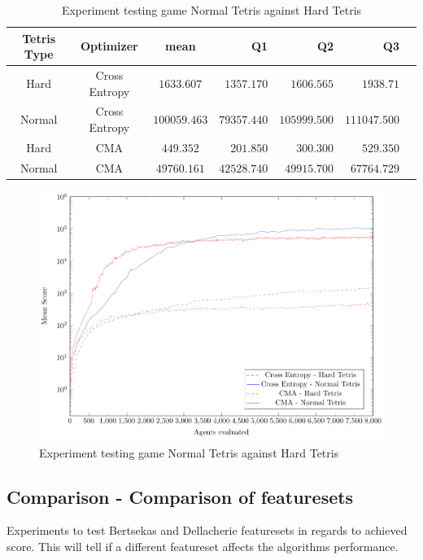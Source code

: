 \clearpage


\begin{table}[H]
\centering
\small
\begin{tabular}{c c c r r r r}
Tetris Type & Optimizer & mean & Q1 & Q2 & Q3\\
\hline
Hard & Cross Entropy & $1633.607$ & $1357.170$ & $1606.565$ & $1938.71$\\
Normal & Cross Entropy & $100059.463$ & $79357.440$ & $105999.500$ & $111047.500$\\
Hard & CMA & $449.352$ & $201.850$ & $300.300$ & $529.350$\\
Normal & CMA & $49760.161$ & $42528.740$ & $49915.700$ & $67764.729$\\
\end{tabular}
\caption{Experiment testing game Normal Tetris against Hard Tetris}
\end{table}

\begin{figure}[H]
\centering
\includegraphics[scale=1]{data/complexity/mean/PlotFile.pdf}
\caption{Experiment testing game Normal Tetris against Hard Tetris}
\end{figure}

\clearpage

\subsection{Comparison - Comparison of featuresets}
Experiments to test Bertsekas and Dellacherie featuresets in regards to achieved score. This will tell if a different featureset affects the algorithms performance. 

